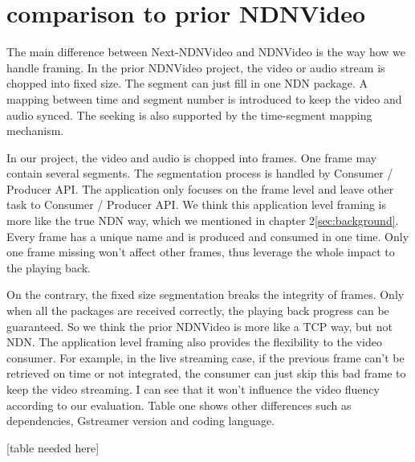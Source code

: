 \section{comparison to prior NDNVideo} %
\label{sec:comparison}
The main difference between Next-NDNVideo and NDNVideo is the way how we handle framing. In the prior NDNVideo project, the video or audio stream is chopped into fixed size. The segment can just fill in one NDN package. A mapping between time and segment number is introduced to keep the video and audio synced. The seeking is also supported by the time-segment mapping mechanism. 

In our project, the video and audio is chopped into frames. One frame may contain several segments. The segmentation process is handled by Consumer / Producer API. The application only focuses on the frame level and leave other task to Consumer / Producer API. We think this application level framing is more like the true NDN way, which we mentioned in chapter 2\ref{sec:background}. Every frame has a unique name and is produced and consumed in one time. Only one frame missing won't affect other frames, thus leverage the whole impact to the playing back. 

On the contrary, the fixed size segmentation breaks the integrity of frames. Only when all the packages are received correctly, the playing back progress can be guaranteed.  So we think the prior NDNVideo is more like a TCP way, but not NDN.  The application level framing also provides the flexibility to the video consumer. For example, in the live streaming case, if the previous frame can't be retrieved on time or not integrated, the consumer can just skip this bad frame to keep the video streaming. I can see that it won't influence the video fluency according to our evaluation. Table one shows other differences such as dependencies, Gstreamer version and coding language.

[table needed here]
